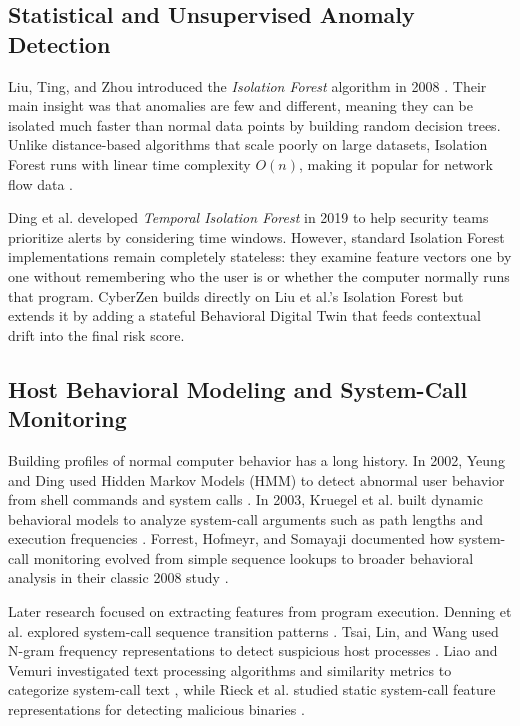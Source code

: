 \documentclass[conference]{IEEEtran}
\begin{document}
\subsection{Statistical and Unsupervised Anomaly Detection}
Liu, Ting, and Zhou introduced the \textit{Isolation Forest} algorithm in 2008 \cite{liu2008isolation}. Their main insight was that anomalies are few and different, meaning they can be isolated much faster than normal data points by building random decision trees. Unlike distance-based algorithms that scale poorly on large datasets, Isolation Forest runs with linear time complexity $O(n)$, making it popular for network flow data \cite{camelo2017unsupervised}. 

Ding et al. developed \textit{Temporal Isolation Forest} in 2019 \cite{ding2019temporal} to help security teams prioritize alerts by considering time windows. However, standard Isolation Forest implementations remain completely stateless: they examine feature vectors one by one without remembering who the user is or whether the computer normally runs that program. CyberZen builds directly on Liu et al.'s Isolation Forest but extends it by adding a stateful Behavioral Digital Twin that feeds contextual drift into the final risk score.

\subsection{Host Behavioral Modeling and System-Call Monitoring}
Building profiles of normal computer behavior has a long history. In 2002, Yeung and Ding used Hidden Markov Models (HMM) to detect abnormal user behavior from shell commands and system calls \cite{yeung2002host}. In 2003, Kruegel et al. built dynamic behavioral models to analyze system-call arguments such as path lengths and execution frequencies \cite{kruegel2003host}. Forrest, Hofmeyr, and Somayaji documented how system-call monitoring evolved from simple sequence lookups to broader behavioral analysis in their classic 2008 study \cite{forrest2008evolution}. 

Later research focused on extracting features from program execution. Denning et al. explored system-call sequence transition patterns \cite{denning2009system}. Tsai, Lin, and Wang used N-gram frequency representations to detect suspicious host processes \cite{tsai2017host}. Liao and Vemuri investigated text processing algorithms and similarity metrics to categorize system-call text \cite{liao2007intrusion}, while Rieck et al. studied static system-call feature representations for detecting malicious binaries \cite{rieck2011static}. 
\end{document}
